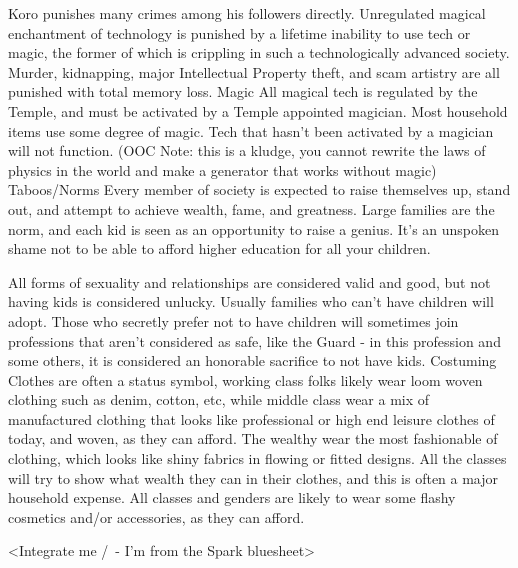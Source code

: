 \documentclass[blue]{GL2020}
\begin{document}
Koro punishes many crimes among his followers directly. Unregulated magical enchantment of technology is punished by a lifetime inability to use tech or magic, the former of which is crippling in such a technologically advanced society. Murder, kidnapping, major Intellectual Property theft, and scam artistry are all punished with total memory loss.
Magic
All magical tech is regulated by the Temple, and must be activated by a Temple appointed magician. Most household items use some degree of magic. Tech that hasn’t been activated by a magician will not function. (OOC Note: this is a kludge, you cannot rewrite the laws of physics in the world and make a generator that works without magic)
Taboos/Norms
Every member of society is expected to raise themselves up, stand out, and attempt to achieve wealth, fame, and greatness. Large families are the norm, and each kid is seen as an opportunity to raise a genius. It's an unspoken shame not to be able to afford higher education for all your children. 

All forms of sexuality and relationships are considered valid and good, but not having kids is considered unlucky. Usually families who can't have children will adopt. Those who secretly prefer not to have children will sometimes join professions that aren't considered as safe, like the Guard - in this profession and some others, it is considered an honorable sacrifice to not have kids.
Costuming
Clothes are often a status symbol, working class folks likely wear loom woven clothing such as denim, cotton, etc, while middle class wear a mix of manufactured clothing that looks like professional or high end leisure clothes of today, and woven, as they can afford.  The wealthy wear the most fashionable of clothing, which looks like shiny fabrics in flowing or fitted designs.  All the classes will try to show what wealth they can in their clothes, and this is often a major household expense.  All classes and genders are likely to wear some flashy cosmetics and/or accessories, as they can afford.


<Integrate me /\ - I’m from the Spark bluesheet>
\end{document}
